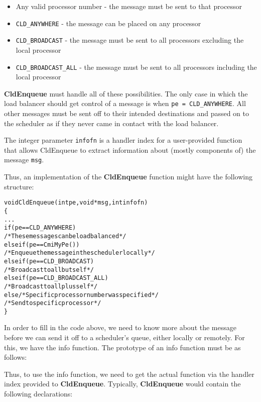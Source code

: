\begin{itemize}
\item Any valid processor number - the message must be sent to
that processor
\item {\tt CLD\_ANYWHERE} - the message can be placed on any processor
\item {\tt CLD\_BROADCAST} - the message must be sent to all processors
excluding the local processor
\item {\tt CLD\_BROADCAST\_ALL} - the message must be sent to all processors
including the local processor
\end{itemize}

{\bf CldEnqueue} must handle all of these possibilities.  The only
case in which the load balancer should get control of a message is when
{\tt pe = CLD\_ANYWHERE}.  All other messages must be sent off to their
intended destinations and passed on to the scheduler as if they never
came in contact with the load balancer. 

The integer parameter {\tt infofn} is a handler index for a
user-provided function that allows CldEnqueue to extract information about
(mostly components of) the message {\tt msg}.

Thus, an implementation of the {\bf CldEnqueue} function might have
the following structure:

\begin{alltt}
void CldEnqueue(int pe, void *msg, int infofn)
\{
  ...
  if (pe == CLD_ANYWHERE)
    /* These messages can be load balanced */
  else if (pe == CmiMyPe())
    /* Enqueue the message in the scheduler locally */
  else if (pe==CLD_BROADCAST) 
    /* Broadcast to all but self */
  else if (pe==CLD_BROADCAST_ALL)
    /* Broadcast to all plus self */
  else /* Specific processor number was specified */
    /* Send to specific processor */
\}
\end{alltt}

In order to fill in the code above, we need to know more about the
message before we can send it off to a scheduler's queue, either
locally or remotely.  For this, we have the info function.  The
prototype of an info function must be as follows:


Thus, to use the info function, we need to get the actual function via
the handler index provided to {\bf CldEnqueue}.  Typically, {\bf
CldEnqueue} would contain the following declarations:

